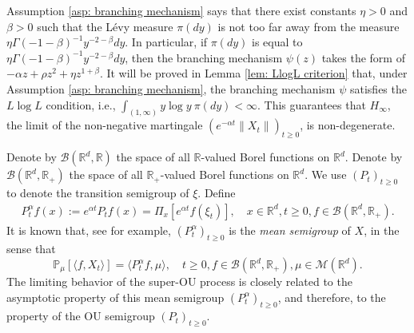 \documentclass[12pt,a4paper]{amsart}
\theoremstyle{plain}
\theoremstyle{definition}
\numberwithin{equation}{section}
\begin{document}
Assumption \ref{asp: branching mechanism} says that there exist constants $\eta>0$ and $\beta > 0$ such that the L\'evy measure $\pi(dy)$ is not too far away from the measure $\eta \Gamma(-1-\beta)^{-1}y^{-2-\beta} dy$.
In particular, if $\pi(dy)$ is equal to $\eta \Gamma(-1-\beta)^{-1}y^{-2-\beta} dy$, then the branching mechanism $\psi(z)$ takes the form of $-\alpha z + \rho z^2 + \eta z^{1+\beta}$.
It will be proved in Lemma \ref{lem: LlogL criterion} that, under Assumption \ref{asp: branching mechanism}, the branching mechanism $\psi$ satisfies the $L \log L$ condition, i.e., $ \int_{(1,\infty)} y\log y~\pi(dy) < \infty. $
This guarantees that $H_\infty$, the limit of the non-negative martingale $(e^{-\alpha t} \|X_t\|)_{t\geq 0}$, is non-degenerate.

Denote by $\mathcal B(\mathbb R^d, \mathbb R)$ the space of all $\mathbb R$-valued Borel functions on $\mathbb R^d$.
Denote by $\mathcal B(\mathbb R^d, \mathbb R_+)$ the space of all $\mathbb R_+$-valued Borel functions on $\mathbb R^d$.
We use  $(P_t)_{t\geq 0}$ to denote the transition semigroup of $\xi$.	
Define
\begin{align}
  \label{eq: meansemigroup}
  P^{\alpha}_t f(x)
  :=
  e^{\alpha t} P_t f(x) 
  = \Pi_x [e^{\alpha t}f(\xi_t)]
  , \quad x\in \mathbb R^d,t\geq 0, f\in \mathcal B(\mathbb R^d, \mathbb R_+).
\end{align}
It is known that, see \cite[Proposition 2.27]{Li2011Measure-valued} for example, $(P^\alpha_t)_{t\geq 0}$ is the \emph{mean semigroup} of $X$, in the sense that
\begin{equation}
  \mathbb{P}_{\mu}[\langle f, X_t \rangle]
  = \langle P^\alpha_t f, \mu \rangle,
  \quad t\geq 0, f\in \mathcal B(\mathbb R^d, \mathbb R_+), \mu \in \mathcal M(\mathbb R^d).
\end{equation}
The limiting behavior of the super-OU process is closely related to the asymptotic property of this mean semigroup $(P^\alpha_t)_{t\geq 0}$, and therefore, to the property of the OU semigroup $(P_t)_{t\geq 0}$.
\end{document}
